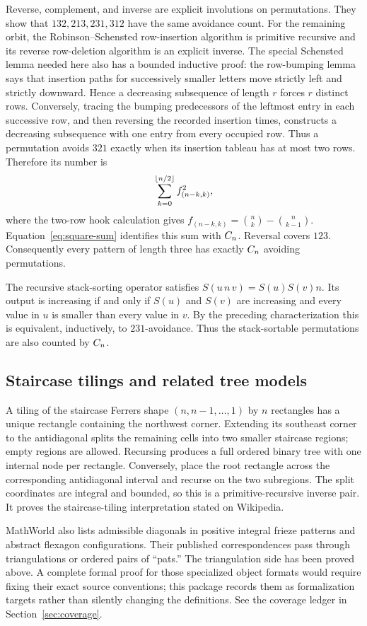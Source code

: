 Reverse, complement, and inverse are explicit involutions on permutations.
They show that $132,213,231,312$ have the same avoidance count.  For the
remaining orbit, the Robinson--Schensted row-insertion algorithm is primitive
recursive and its reverse row-deletion algorithm is an explicit inverse.  The
special Schensted lemma needed here also has a bounded inductive proof: the
row-bumping lemma says that insertion paths for successively smaller letters
move strictly left and strictly downward.  Hence a decreasing subsequence of
length $r$ forces $r$ distinct rows.  Conversely, tracing the bumping
predecessors of the leftmost entry in each successive row, and then reversing
the recorded insertion times, constructs a decreasing subsequence with one
entry from every occupied row.  Thus a permutation avoids $321$ exactly when
its insertion tableau has at most two rows.  Therefore its number is
\[
 \sum_{k=0}^{\left\lfloor n/2\right\rfloor} f_{(n-k,k)}^2,
\]
where the two-row hook calculation gives
$f_{(n-k,k)}=\binom nk-\binom n{k-1}$.  Equation~\eqref{eq:square-sum} identifies
this sum with $C_n$.  Reversal covers $123$.  Consequently every pattern of
length three has exactly $C_n$ avoiding permutations.

The recursive stack-sorting operator satisfies
$S(u\,n\,v)=S(u)S(v)n$.  Its output is increasing if and only if $S(u)$ and
$S(v)$ are increasing and every value in $u$ is smaller than every value in
$v$.  By the preceding characterization this is equivalent, inductively, to
$231$-avoidance.  Thus the stack-sortable permutations are also counted by
$C_n$.

\subsection{Staircase tilings and related tree models}

A tiling of the staircase Ferrers shape $(n,n-1,\ldots,1)$ by $n$ rectangles
has a unique rectangle containing the northwest corner.  Extending its
southeast corner to the antidiagonal splits the remaining cells into two
smaller staircase regions; empty regions are allowed.  Recursing produces a
full ordered binary tree with one internal node per rectangle.  Conversely,
place the root rectangle across the corresponding antidiagonal interval and
recurse on the two subregions.  The split coordinates are integral and
bounded, so this is a primitive-recursive inverse pair.  It proves the
staircase-tiling interpretation stated on Wikipedia.

MathWorld also lists admissible diagonals in positive integral frieze patterns
and abstract flexagon configurations.  Their published correspondences pass
through triangulations or ordered pairs of ``pats.''  The triangulation side
has been proved above.  A complete formal proof for those specialized object
formats would require fixing their exact source conventions; this package
records them as formalization targets rather than silently changing the
definitions.  See the coverage ledger in Section~\ref{sec:coverage}.
